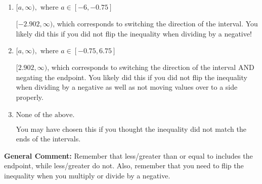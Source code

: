 \documentclass{extbook}[14pt]
\begin{document}
\begin{enumerate}
{\begin{enumerate}[label=\Alph*.]
 $(-\infty, 2.902]$, which corresponds to negating the endpoint of the solution.
\item \( [a, \infty), \text{ where } a \in [-6, -0.75] \)

 $[-2.902, \infty)$, which corresponds to switching the direction of the interval. You likely did this if you did not flip the inequality when dividing by a negative!
\item \( [a, \infty), \text{ where } a \in [-0.75, 6.75] \)

 $[2.902, \infty)$, which corresponds to switching the direction of the interval AND negating the endpoint. You likely did this if you did not flip the inequality when dividing by a negative as well as not moving values over to a side properly.
\item \( \text{None of the above}. \)

You may have chosen this if you thought the inequality did not match the ends of the intervals.
\end{enumerate}

\textbf{General Comment:} Remember that less/greater than or equal to includes the endpoint, while less/greater do not. Also, remember that you need to flip the inequality when you multiply or divide by a negative.
}
\end{enumerate}
\end{document}
